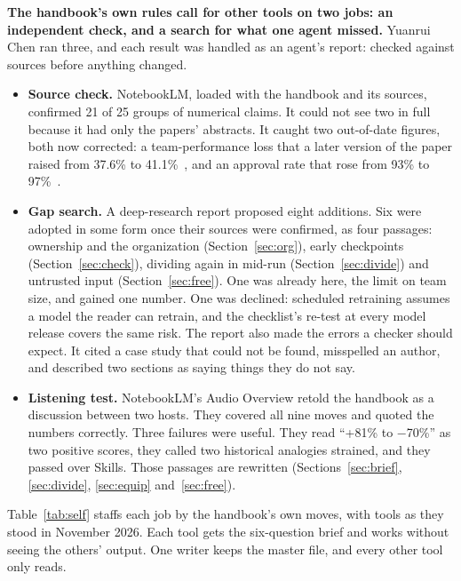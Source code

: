 \documentclass[11pt,letterpaper]{article}
\newcommand{\takeaway}[1]{\textbf{#1}}
\begin{document}
\takeaway{The handbook's own rules call for other tools on two jobs: an independent check,
and a search for what one agent missed.} Yuanrui Chen ran three, and each result was handled
as an agent's report: checked against sources before anything changed.

\begin{itemize}
  \item \textbf{Source check.} NotebookLM, loaded with the handbook and its sources, confirmed
        21 of 25 groups of numerical claims. It could not see two in full because it had only
        the papers' abstracts. It caught two out-of-date figures, both now corrected: a
        team-performance loss that a later version of the paper raised from 37.6\% to
        41.1\%~\cite{pappu}, and an approval rate that rose from 93\% to
        97\%~\cite{newstack}.
  \item \textbf{Gap search.} A deep-research report proposed eight additions. Six were
        adopted in some form once their sources were confirmed, as four passages: ownership
        and the organization (Section~\ref{sec:org}), early checkpoints (Section~\ref{sec:check}),
        dividing again in mid-run (Section~\ref{sec:divide}) and untrusted input
        (Section~\ref{sec:free}). One was already here, the limit on team size, and gained
        one number. One was declined: scheduled retraining assumes a model the reader can
        retrain, and the checklist's re-test at every model release covers the same risk.
        The report also made the errors a checker should expect. It cited a case study that
        could not be found, misspelled an author, and described two sections as saying things
        they do not say.
  \item \textbf{Listening test.} NotebookLM's Audio Overview retold the handbook as a
        discussion between two hosts. They covered all nine moves and quoted the numbers
        correctly. Three failures were useful. They read ``+81\% to $-$70\%'' as two positive
        scores, they called two historical analogies strained, and they passed over Skills.
        Those passages are rewritten (Sections~\ref{sec:brief}, \ref{sec:divide},
        \ref{sec:equip} and~\ref{sec:free}).
\end{itemize}

Table~\ref{tab:self} staffs each job by the handbook's own moves, with tools as they stood in
November 2026. Each tool gets the six-question brief and works without seeing the others'
output. One writer keeps the master file, and every other tool only reads.
\end{document}

